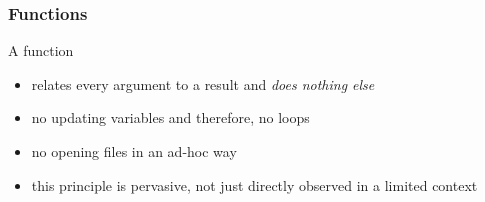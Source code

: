 \begin{frame}
\frametitle{Functions}
\begin{block}{A function}
\begin{itemize}
  \item<1> relates every argument to a result and \emph{does nothing else}
  \item<2> no updating variables and therefore, no loops
  \item<3> no opening files in an ad-hoc way
  \item<4> this principle is pervasive, not just directly observed in a limited context
\end{itemize}
\end{block}
\end{frame}
